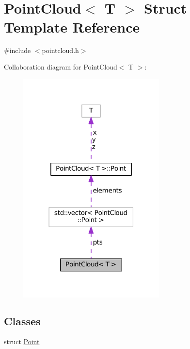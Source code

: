 \hypertarget{struct_point_cloud}{\section{Point\-Cloud$<$ T $>$ Struct Template Reference}
\label{struct_point_cloud}
}


{\ttfamily \#include $<$pointcloud.\-h$>$}



Collaboration diagram for Point\-Cloud$<$ T $>$\-:
\nopagebreak
\begin{figure}[H]
\begin{center}
\leavevmode
\includegraphics[width=210pt]{struct_point_cloud__coll__graph}
\end{center}
\end{figure}
\subsection*{Classes}
\begin{DoxyCompactItemize}
\item 
struct \hyperlink{struct_point_cloud_1_1_point}{Point}
\end{DoxyCompactItemize}
